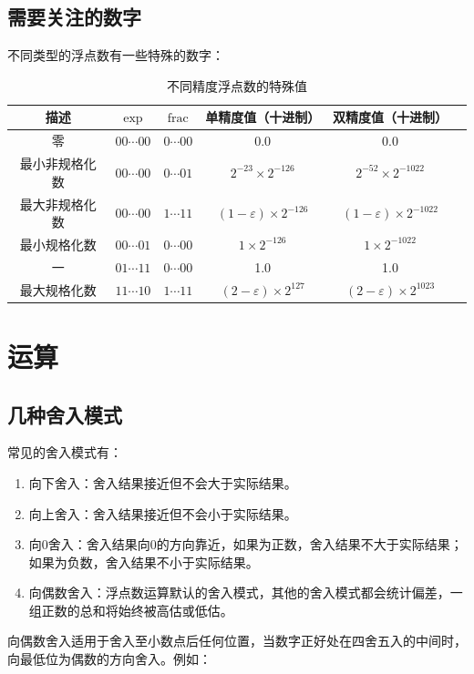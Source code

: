 \documentclass[a4paper, 12pt, UTF8]{ctexart}
\begin{document}
\subsection{需要关注的数字}
不同类型的浮点数有一些特殊的数字：
\begin{table}[h]
    \centering
    \begin{tabular}{|c|c|c|c|c|c|}
        \hline
        描述      & \(\text{exp}\) & \(\text{frac}\) & 单精度值（十进制）                         & 双精度值（十进制）                          \\
        \hline
        零       & \(00\cdots00\) & \(0\cdots00\)   & 0.0                               & 0.0                                \\
        最小非规格化数 & \(00\cdots00\) & \(0\cdots01\)   & \(2^{-23}\times2^{-126}\)         & \(2^{-52}\times2^{-1022}\)         \\
        最大非规格化数 & \(00\cdots00\) & \(1\cdots11\)   & \((1-\varepsilon)\times2^{-126}\) & \((1-\varepsilon)\times2^{-1022}\) \\
        最小规格化数  & \(00\cdots01\) & \(0\cdots00\)   & \(1\times2^{-126}\)               & \(1\times2^{-1022}\)               \\
        一       & \(01\cdots11\) & \(0\cdots00\)   & 1.0                               & 1.0                                \\
        最大规格化数  & \(11\cdots10\) & \(1\cdots11\)   & \((2-\varepsilon)\times2^{127}\)  & \((2-\varepsilon)\times2^{1023}\)  \\
        \hline
    \end{tabular}
    \caption{不同精度浮点数的特殊值}
\end{table}




\section{运算}
\subsection{几种舍入模式}
常见的舍入模式有：
\begin{enumerate}
    \item 向下舍入：舍入结果接近但不会大于实际结果。
    \item 向上舍入：舍入结果接近但不会小于实际结果。
    \item 向0舍入：舍入结果向0的方向靠近，如果为正数，舍入结果不大于实际结果；如果为负数，舍入结果不小于实际结果。
    \item 向偶数舍入：浮点数运算默认的舍入模式，其他的舍入模式都会统计偏差，一组正数的总和将始终被高估或低估。
\end{enumerate}
向偶数舍入适用于舍入至小数点后任何位置，当数字正好处在四舍五入的中间时，向最低位为偶数的方向舍入。例如：
\end{document}
